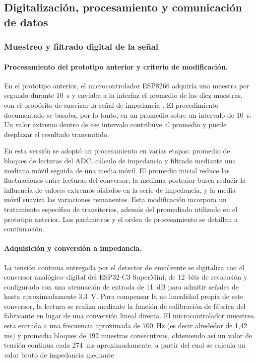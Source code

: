 \documentclass[12pt,a4paper]{article}
\begin{document}
\clearpage
\subsection{Digitalización, procesamiento y comunicación de datos}

\subsubsection{Muestreo y filtrado digital de la señal}

\paragraph{Procesamiento del prototipo anterior y criterio de modificación.}
En el prototipo anterior, el microcontrolador ESP8266 adquiría una muestra por segundo durante 10~s
y enviaba a la interfaz el promedio de las diez muestras, con el propósito de suavizar la
señal de impedancia \cite{informe_grupo2_2025}. El procedimiento documentado se basaba,
por lo tanto, en un promedio sobre un intervalo de 10~s. Un valor extremo dentro de ese
intervalo contribuye al promedio y puede desplazar el resultado transmitido.

En esta versión se adoptó un procesamiento en varias etapas: promedio de bloques de lecturas
del ADC, cálculo de impedancia y filtrado mediante una mediana móvil seguida de una media móvil.
El promedio inicial reduce las fluctuaciones entre lecturas del conversor; la mediana posterior
busca reducir la influencia de valores extremos aislados en la serie de impedancia, y la media
móvil suaviza las variaciones remanentes. Esta modificación incorpora un tratamiento específico
de transitorios, además del promediado utilizado en el prototipo anterior. Los parámetros y
el orden de procesamiento se detallan a continuación.

\paragraph{Adquisición y conversión a impedancia.}
La tensión continua entregada por el detector de envolvente se digitaliza con el conversor
analógico--digital del ESP32-C3 SuperMini, de 12~bits de resolución y configurado con una atenuación de entrada
de 11~dB para admitir señales de hasta aproximadamente 3,3~V. Para compensar la no linealidad propia de
este conversor, la lectura se realiza mediante la función de calibración de fábrica del fabricante en
lugar de una conversión lineal directa. El microcontrolador muestrea esta entrada a una frecuencia
aproximada de 700~Hz (es decir alrededor de 1,42 ms) y promedia bloques de 192 muestras consecutivas, obteniendo así un valor de tensión
continua cada 274~ms aproximadamente, a partir del cual se calcula un valor bruto de impedancia mediante
\end{document}
